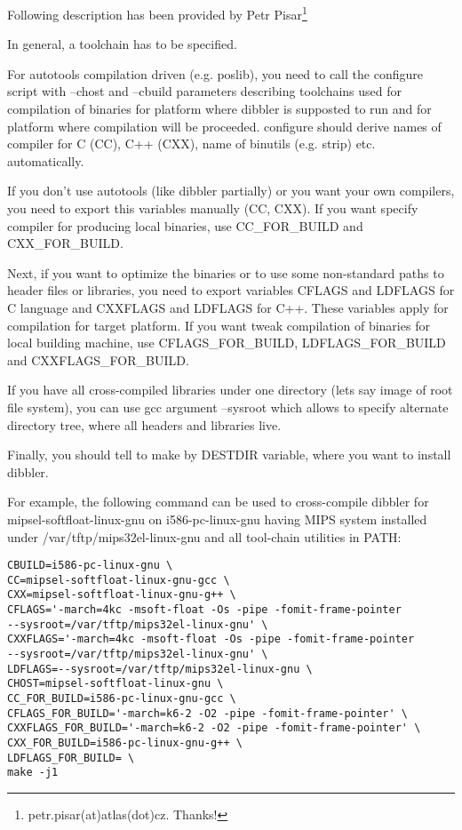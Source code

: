 Following description has been provided by Petr
Pisar\footnote{petr.pisar(at)atlas(dot)cz. Thanks!}

In general, a toolchain has to be specified.

For autotools compilation driven (e.g. poslib), you need to call the
configure script with --chost and --cbuild parameters describing
toolchains used for compilation of binaries for platform where dibbler
is supposted to run and for platform where compilation will be
proceeded. configure should derive names of compiler for C (CC), C++
(CXX), name of binutils (e.g. strip) etc. automatically.

If you don't use autotools (like dibbler partially) or you want your own
compilers, you need to export this variables manually (CC, CXX). If you
want specify compiler for producing local binaries, use CC\_FOR\_BUILD and
CXX\_FOR\_BUILD.

Next, if you want to optimize the binaries or to use some non-standard
paths to header files or libraries, you need to export variables CFLAGS
and LDFLAGS for C language and CXXFLAGS and LDFLAGS for C++. These
variables apply for compilation for target platform. If you want tweak
compilation of binaries for local building machine, use
CFLAGS\_FOR\_BUILD, LDFLAGS\_FOR\_BUILD and CXXFLAGS\_FOR\_BUILD.

If you have all cross-compiled libraries under one directory (lets say
image of root file system), you can use gcc argument --sysroot which
allows to specify alternate directory tree, where all headers and
libraries live.

Finally, you should tell to make by DESTDIR variable, where you want to
install dibbler.

For example, the following command can be used to cross-compile dibbler for
mipsel-softfloat-linux-gnu on i586-pc-linux-gnu having MIPS system
installed under /var/tftp/mips32el-linux-gnu and all tool-chain utilities in PATH:

\begin{lstlisting}
CBUILD=i586-pc-linux-gnu \
CC=mipsel-softfloat-linux-gnu-gcc \
CXX=mipsel-softfloat-linux-gnu-g++ \
CFLAGS='-march=4kc -msoft-float -Os -pipe -fomit-frame-pointer
--sysroot=/var/tftp/mips32el-linux-gnu' \
CXXFLAGS='-march=4kc -msoft-float -Os -pipe -fomit-frame-pointer
--sysroot=/var/tftp/mips32el-linux-gnu' \
LDFLAGS=--sysroot=/var/tftp/mips32el-linux-gnu \
CHOST=mipsel-softfloat-linux-gnu \
CC_FOR_BUILD=i586-pc-linux-gnu-gcc \
CFLAGS_FOR_BUILD='-march=k6-2 -O2 -pipe -fomit-frame-pointer' \
CXXFLAGS_FOR_BUILD='-march=k6-2 -O2 -pipe -fomit-frame-pointer' \
CXX_FOR_BUILD=i586-pc-linux-gnu-g++ \
LDFLAGS_FOR_BUILD= \
make -j1
\end{lstlisting}
